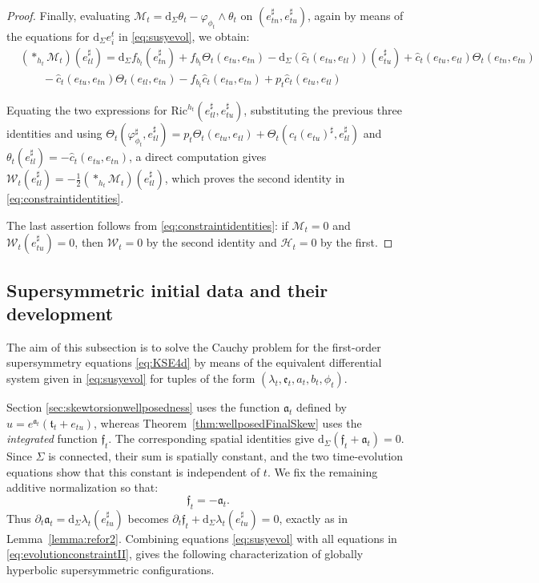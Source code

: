 \documentclass[10pt,reqno,a4paper]{amsart}
\theoremstyle{plain}
\theoremstyle{definition}
\theoremstyle{remark}
\theoremstyle{remark}
\def\dd{\mathrm{d}}
\def\cH{\mathcal{H}}
\def\cM{\mathcal{M}}
\def\cW{\mathcal{W}}
\def\cH{\mathcal{H}}
\def\fra{\mathfrak{a}}
\def\fre{\mathfrak{e}}
\newcommand{\Ric}{\mathrm{Ric}}
\renewcommand{\(}{ (}
\renewcommand{\)}{ )}
\newcommand{\frf}{\mathfrak{f}}
\begin{document}
\begin{proof}
\noindent
Finally, evaluating $\cM_t = \dd_{\Sigma}\theta_t - \varphi_{\phi_t}\wedge\theta_t$ on $(e^{\sharp}_{tn},e^{\sharp}_{tu})$, again by means of the equations for $\dd_{\Sigma} e^t_i$ in \eqref{eq:susyevol}, we obtain:
\begin{eqnarray*}
& (\ast_{h_t}\cM_t)(e^{\sharp}_{tl}) = \dd_{\Sigma} f_{b_t}(e^{\sharp}_{tn}) + f_{b_t}\Theta_t(e_{tu},e_{tn}) - \dd_{\Sigma}(\widehat{c}_t (e_{tu},e_{tl}))(e^{\sharp}_{tu}) + \widehat{c}_t (e_{tu},e_{tl})\Theta_t(e_{tn},e_{tn}) \\
& \qquad - \widehat{c}_t (e_{tu},e_{tn})\Theta_t(e_{tl},e_{tn}) - f_{b_t}\widehat{c}_t (e_{tu},e_{tn}) + p_t\widehat{c}_t (e_{tu},e_{tl})
\end{eqnarray*}

\noindent
Equating the two expressions for $\Ric^{h_t}(e^{\sharp}_{tl},e^{\sharp}_{tu})$, substituting the previous three identities and using $\Theta_t(\varphi_{\phi_t}^{\sharp},e^{\sharp}_{tl}) = p_t\Theta_t(e_{tu},e_{tl}) + \Theta_t(\widehat{c}_t (e_{tu})^{\sharp},e^{\sharp}_{tl})$ and $\theta_t(e^{\sharp}_{tl}) = -\widehat{c}_t (e_{tu},e_{tn})$, a direct computation gives $\cW_t(e^{\sharp}_{tl}) = -\frac{1}{2}(\ast_{h_t}\cM_t)(e^{\sharp}_{tl})$, which proves the second identity in \eqref{eq:constraintidentities}. 

\noindent
The last assertion follows from \eqref{eq:constraintidentities}: if $\cM_t = 0$ and $\cW_t(e^{\sharp}_{tu}) = 0$, then $\cW_t = 0$ by the second identity and $\cH_t = 0$ by the first.
\end{proof}
 

%

\subsection{Supersymmetric initial data and their development}
\label{sec:susyinitialdevelopment}

%

The aim of this subsection is to solve the Cauchy problem for the first-order supersymmetry equations \eqref{eq:KSE4d} by means of the equivalent differential system given in \eqref{eq:susyevol} for tuples of the form $(\lambda_t,\fre_t,a_t,b_t,\phi_t)$.   

Section \ref{sec:skewtorsionwellposedness} uses the function $\fra_t$ defined by $u=e^{\fra_t}(\mathfrak t_t+e_{tu})$, whereas
Theorem~\ref{thm:wellposedFinalSkew} uses the \emph{integrated} function $\frf_t$. The corresponding spatial identities give
$\dd_\Sigma(\frf_t+\fra_t)=0$.  Since $\Sigma$ is connected, their sum is spatially constant, and the two time-evolution equations show that this constant is independent of $t$.  We fix the remaining additive normalization so that:
\begin{equation}
\label{eq:NSNS-scale-identification}
 \frf_t=-\fra_t.
\end{equation}
Thus $\partial_t\fra_t=\dd_\Sigma\lambda_t(e^{\sharp}_{tu})$ becomes $\partial_t\frf_t + \dd_\Sigma \lambda_t(e^{\sharp}_{tu}) =0$, exactly as in Lemma~\ref{lemma:refor2}. Combining equations \eqref{eq:susyevol} with all equations in \eqref{eq:evolutionconstraintII}, gives the following characterization of globally hyperbolic supersymmetric configurations. 
 
\end{document}
